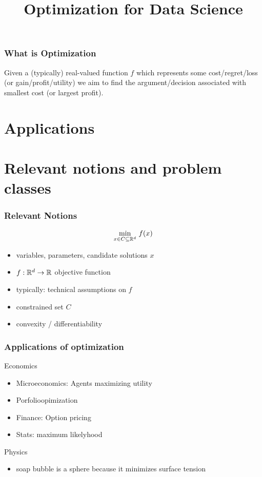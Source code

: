 \documentclass{beamer}
\title{Optimization for Data Science}
\begin{document}
\maketitle
\frame{\tableofcontents[currentsection]}


\begin{frame}
  \frametitle{What is Optimization}

  Given a (typically) real-valued function $f$ which represents some cost/regret/loss (or gain/profit/utility) we aim to find the argument/decision associated with smallest cost (or largest profit).

\end{frame}

\section{Applications}



\section{Relevant notions and problem classes}

\begin{frame}
  \frametitle{Relevant Notions}
  \begin{equation}
    \min_{x\in C \subseteq \mathbb{R}^d} \, f(x)
  \end{equation}

  \begin{itemize}
    \item variables, parameters, candidate solutions $x$
    \item $f: \mathbb{R}^d \to \mathbb{R}$ objective function
    \item typically: technical assumptions on $f$
    \item constrained set $C$
    \item convexity / differentiability
  \end{itemize}
\end{frame}


\begin{frame}
  \frametitle{Applications of optimization}

  Economics
  \begin{itemize}
    \item Microeconomics: Agents maximizing utility
    \item Porfolioopimization
    \item Finance: Option pricing
    \item Stats: maximum likelyhood
  \end{itemize}
  Physics
  \begin{itemize}
    \item soap bubble is a sphere because it minimizes surface tension
  \end{itemize}

\end{frame}
\end{document}
